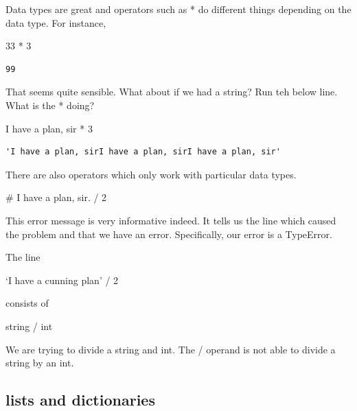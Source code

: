 \documentclass[
  letterpaper,
  DIV=11,
  numbers=noendperiod]{scrreprt}
\newenvironment{Shaded}{\begin{snugshade}}{\end{snugshade}}
\newcommand{\CommentTok}[1]{\textcolor[rgb]{0.37,0.37,0.37}{#1}}
\newcommand{\DecValTok}[1]{\textcolor[rgb]{0.68,0.00,0.00}{#1}}
\newcommand{\OperatorTok}[1]{\textcolor[rgb]{0.37,0.37,0.37}{#1}}
\begin{document}
Data types are great and operators such as * do different things
depending on the data type. For instance,

\begin{Shaded}
\begin{Highlighting}[]
\DecValTok{33} \OperatorTok{*} \DecValTok{3}
\end{Highlighting}
\end{Shaded}

\begin{verbatim}
99
\end{verbatim}

That seems quite sensible. What about if we had a string? Run teh below
line. What is the * doing?

\begin{Shaded}
\begin{Highlighting}[]
\CommentTok{\textquotesingle{}I have a plan, sir\textquotesingle{}} \OperatorTok{*} \DecValTok{3}
\end{Highlighting}
\end{Shaded}

\begin{verbatim}
'I have a plan, sirI have a plan, sirI have a plan, sir'
\end{verbatim}

There are also operators which only work with particular data types.

\begin{Shaded}
\begin{Highlighting}[]
\CommentTok{\# \textquotesingle{}I have a plan, sir.\textquotesingle{} / 2}
\end{Highlighting}
\end{Shaded}

This error message is very informative indeed. It tells us the line
which caused the problem and that we have an error. Specifically, our
error is a TypeError.

The line

`I have a cunning plan' / 2

consists of

string / int

We are trying to divide a string and int. The / operand is not able to
divide a string by an int.

\hypertarget{lists-and-dictionaries}{%
\subsection{lists and dictionaries}\label{lists-and-dictionaries}}
\end{document}
